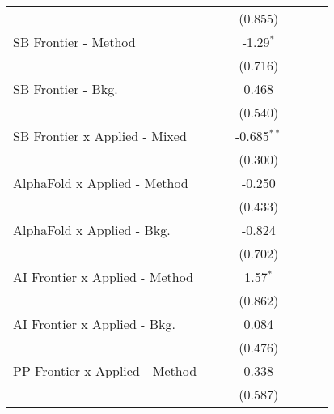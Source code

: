 \begin{tabular}{lcccccc}
                                  &               &              & (0.855)       &               &        &   \\   
   SB Frontier - Method           &               &              & -1.29$^{*}$   &               &        &   \\   
                                  &               &              & (0.716)       &               &        &   \\   
   SB Frontier - Bkg.             &               &              & 0.468         &               &        &   \\   
                                  &               &              & (0.540)       &               &        &   \\   
   SB Frontier x Applied - Mixed  &               &              & -0.685$^{**}$ &               &        &   \\   
                                  &               &              & (0.300)       &               &        &   \\   
   AlphaFold x Applied - Method   &               &              & -0.250        &               &        &   \\   
                                  &               &              & (0.433)       &               &        &   \\   
   AlphaFold x Applied - Bkg.     &               &              & -0.824        &               &        &   \\   
                                  &               &              & (0.702)       &               &        &   \\   
   AI Frontier x Applied - Method &               &              & 1.57$^{*}$    &               &        &   \\   
                                  &               &              & (0.862)       &               &        &   \\   
   AI Frontier x Applied - Bkg.   &               &              & 0.084         &               &        &   \\   
                                  &               &              & (0.476)       &               &        &   \\   
   PP Frontier x Applied - Method &               &              & 0.338         &               &        &   \\   
                                  &               &              & (0.587)       &               &        &   \\   

\end{tabular}
